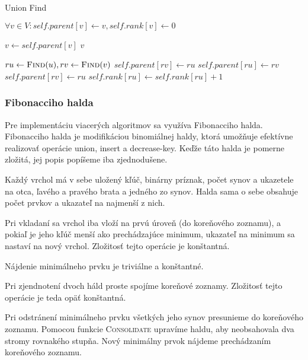 \begin{algorithm}[H]
\caption{Union Find}
\label{alg:union_find}
\begin{algorithmic}[1]
    \State $\forall v \in V : self.parent[v] \gets v, self.rank[v] \gets 0$
\EndFunction

        \State $v \gets self.parent[v]$
    \EndWhile
    \State \Return $v$
\EndFunction

    \State $ru \gets \Call{Find}{u}, rv \gets \Call{Find}{v}$
            \State $self.parent[rv] \gets ru$
            \State $self.parent[ru] \gets rv$
        \Else
            \State $self.parent[rv] \gets ru$
            \State $self.rank[ru] \gets self.rank[ru] + 1$
        \EndIf
    \EndIf
\EndFunction

\end{algorithmic}
\end{algorithm}

\subsubsection{Fibonacciho halda}

Pre implementáciu viacerých algoritmov sa využíva Fibonacciho halda.
Fibonacciho halda je modifikáciou binomiálnej haldy, ktorá umožňuje
efektívne realizovať operácie union, insert a decrease-key.
Keďže táto halda je pomerne zložitá, jej popis popíšeme iba zjednodušene.

Každý vrchol má v sebe uložený kľúč, binárny príznak, počet synov
a ukazetele na otca, ľavého a pravého brata a jedného zo synov.
Halda sama o sebe obsahuje počet prvkov a ukazateľ na najmenší z nich.

Pri vkladaní sa vrchol iba vloží na prvú úroveň (do koreňového zoznamu), 
a pokiaľ je jeho kľúč menší ako prechádzajúce minimum, ukazateľ
na minimum sa nastaví na nový vrchol. Zložitosť tejto operácie je konštantná.

Nájdenie minimálneho prvku je triviálne a konštantné.

Pri zjendnotení dvoch háld proste spojíme koreňové zoznamy. Zložitosť
tejto operácie je teda opäť konštantná.

Pri odstránení minimálneho prvku všetkých jeho synov presunieme do 
koreňového zoznamu. Pomocou funkcie \textsc{Consolidate} upravíme haldu,
aby neobsahovala dva stromy rovnakého stupňa. Nový minimálny 
prvok nájdeme prechádzaním koreňového zoznamu.

